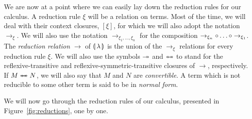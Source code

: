 We are now at a point where we can easily lay down the reduction rules for
our calculus. A reduction rule $\xi$ will be a relation on terms. Most of
the time, we will deal with their context closures, $[\xi]$, for which we
will also adopt the notation $\to_\xi$. We will also use the notation
$\to_{\xi_1,\dots,\xi_n}$ for the composition
$\to_{\xi_n} {\mathbin{\circ}} \dots {\mathbin{\circ}} \to_{\xi_1}$. The \emph{reduction relation}
$\to$ of $\llparenthesis \, \lambda \, \rrparenthesis$ is the union of the $\to_\xi$ relations for
every reduction rule $\xi$. We will also use the symbols $\twoheadrightarrow$ and
$\twoheadleftarrow \mathrel{\mkern-15mu} \twoheadrightarrow$ to stand for the reflexive-transitive and
reflexive-symmetric-transitive closures of $\to$, respectively. If
$M \twoheadleftarrow \mathrel{\mkern-15mu} \twoheadrightarrow N$, we will also say that $M$ and $N$ are \emph{convertible}.
A term which is not reducible to some other term is said to be in
\emph{normal form}.

We will now go through the reduction rules of our calculus, presented in
Figure~\ref{fig:reductions}, one by one.



